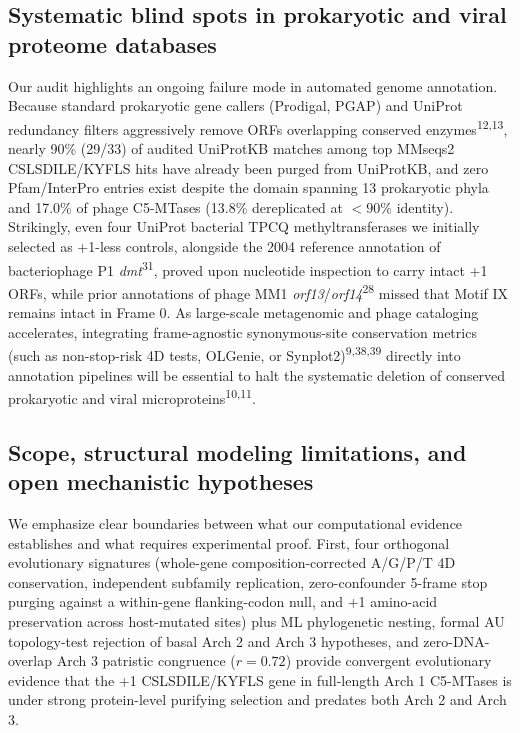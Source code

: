\documentclass[10pt,letterpaper]{article}
\newcommand{\gene}[1]{\textit{#1}}
\newcommand{\refsup}[1]{\textsuperscript{#1}}
\begin{document}
\subsection{Systematic blind spots in prokaryotic and viral proteome databases}

Our audit highlights an ongoing failure mode in automated genome annotation. Because standard prokaryotic gene callers (Prodigal, PGAP) and UniProt redundancy filters aggressively remove ORFs overlapping conserved enzymes\refsup{12,13}, nearly 90\% (29/33) of audited UniProtKB matches among top MMseqs2 CSLSDILE/KYFLS hits have already been purged from UniProtKB, and zero Pfam/InterPro entries exist despite the domain spanning 13 prokaryotic phyla and 17.0\% of phage C5-MTases (13.8\% dereplicated at $< 90\%$ identity). Strikingly, even four UniProt bacterial TPCQ methyltransferases we initially selected as +1-less controls, alongside the 2004 reference annotation of bacteriophage P1 \gene{dmt}\refsup{31}, proved upon nucleotide inspection to carry intact +1 ORFs, while prior annotations of phage MM1 \gene{orf13}/\gene{orf14}\refsup{28} missed that Motif IX remains intact in Frame 0. As large-scale metagenomic and phage cataloging accelerates, integrating frame-agnostic synonymous-site conservation metrics (such as non-stop-risk 4D tests, OLGenie, or Synplot2)\refsup{9,38,39} directly into annotation pipelines will be essential to halt the systematic deletion of conserved prokaryotic and viral microproteins\refsup{10,11}.

\subsection{Scope, structural modeling limitations, and open mechanistic hypotheses}

We emphasize clear boundaries between what our computational evidence establishes and what requires experimental proof. First, four orthogonal evolutionary signatures (whole-gene composition-corrected A/G/P/T 4D conservation, independent subfamily replication, zero-confounder 5-frame stop purging against a within-gene flanking-codon null, and +1 amino-acid preservation across host-mutated sites) plus ML phylogenetic nesting, formal AU topology-test rejection of basal Arch 2 and Arch 3 hypotheses, and zero-DNA-overlap Arch 3 patristic congruence ($r = 0.72$) provide convergent evolutionary evidence that the +1 CSLSDILE/KYFLS gene in full-length Arch 1 C5-MTases is under strong protein-level purifying selection and predates both Arch 2 and Arch 3.
\end{document}
